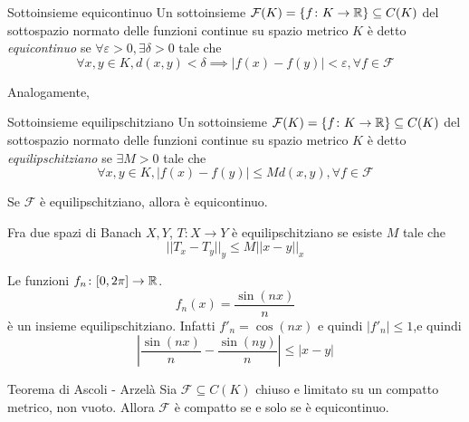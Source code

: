 \documentclass[a4paper]{article}
\begin{document}
\begin{snippetdefinition}{Sottoinsieme equicontinuo}
    Un sottoinsieme \(\mathcal{F}(K) = \{f\colon K \to \mathbb{R}\} \subseteq C(K)\)
    del sottospazio normato delle funzioni continue su spazio metrico \(K\)
    è detto \emph{equicontinuo} se \(\forall \varepsilon > 0, \exists \delta > 0\)
    tale che
    \[
        \forall x,y\in K, d(x,y) < \delta
        \implies |f(x) - f(y)| < \varepsilon, \forall f \in \mathcal{F}
    \]
\end{snippetdefinition}

Analogamente,

\begin{snippetdefinition}{Sottoinsieme equilipschitziano}
    Un sottoinsieme \(\mathcal{F}(K) = \{f\colon K \to \mathbb{R}\} \subseteq C(K)\)
    del sottospazio normato delle funzioni continue su spazio metrico \(K\)
    è detto \emph{equilipschitziano} se \(\exists M > 0\)
    tale che
    \[
        \forall x,y\in K,
        |f(x) - f(y)| \leq Md(x,y), \forall f \in \mathcal{F}
    \]
\end{snippetdefinition}

\begin{snippetproposition}{}
    Se \(\mathcal{F}\) è equilipschitziano, allora è equicontinuo.
\end{snippetproposition}

\begin{snippetexample}{}
    Fra due spazi di Banach \(X,Y\), \(T \colon X \to Y\) è equilipschitziano
    se esiste \(M\) tale che
    \[
        ||T_x - T_y||_y \leq M ||x-y||_x
    \]
\end{snippetexample}

\begin{snippetexample}{}
    Le funzioni \(f_n \colon [0, 2\pi] \to \mathbb{R}\).
    \[
        f_n(x) = \frac{\sin(nx)}{n}
    \]
    è un insieme equilipschitziano.
    Infatti \(f'_n = \cos(nx)\) e quindi \(|f'_n| \leq 1\),e quindi
    \[
        \left|
            \frac{\sin(nx)}{n} - \frac{\sin(ny)}{n}
        \right| \leq |x-y|
    \]
\end{snippetexample}

\begin{snippettheorem}{Teorema di Ascoli - Arzelà}
    Sia \(\mathcal{F} \subseteq C(K)\) chiuso e limitato su un compatto metrico, non vuoto.
    Allora \(\mathcal{F}\) è compatto se e solo se
    è equicontinuo.
\end{snippettheorem}

\pagebreak
\end{document}
